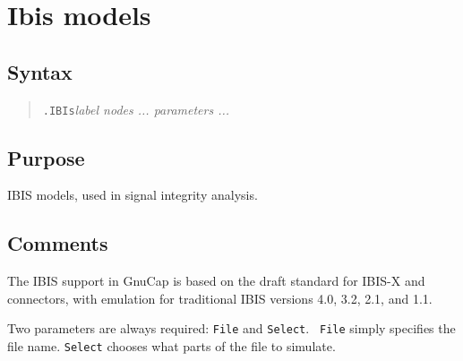 %
%
%
%
\section{Ibis models}
\subsection{Syntax}
\begin{verse}
{\tt .IBIs}{\it label nodes ... parameters ...}
\end{verse}
\subsection{Purpose}

IBIS models, used in signal integrity analysis.
\subsection{Comments}

The IBIS support in GnuCap is based on the draft standard for IBIS-X and
connectors, with emulation for traditional IBIS versions 4.0, 3.2,
2.1, and 1.1.

Two parameters are always required: {\tt File} and {\tt Select}.  {\tt
  File} simply specifies the file name.  {\tt Select} chooses what
parts of the file to simulate.

